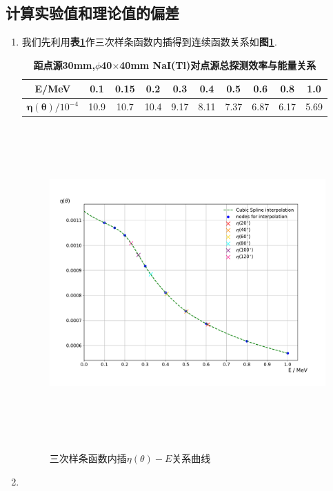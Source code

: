 \documentclass[a4paper]{article}
\begin{document}
\subsection{计算实验值和理论值的偏差}\label{sub4}
\begin{enumerate}[(1)]
\item 
我们先利用\textbf{表\ref{tab:table3}}作三次样条函数内插得到连续函数关系如\textbf{图\ref{fig:fig2}}.
\begin{table}[H]
\caption{\textbf{距点源30mm,$\phi$40$\times$40mm NaI(Tl)对点源总探测效率与能量关系}}
\label{tab:table3}
\begin{center}
\setlength{\tabcolsep}{4mm}
\begin{tabular}{|c|c|c|c|c|c|c|c|c|c|}%
    \toprule
	\hline
	\textbf{E/MeV} & 0.1 & 0.15 & 0.2 & 0.3 & 0.4 & 0.5 & 0.6 & 0.8 & 1.0\\ \hline
	$\bm{\eta(\theta)}/10^{-4}$ & 10.9 & 10.7 & 10.4 & 9.17 & 8.11 & 7.37 & 6.87 & 6.17 & 5.69\\ \hline
	\bottomrule
	\end{tabular}
\end{center}
\end{table}
\begin{figure}[H]
 \centering
 \caption{三次样条函数内插$\eta(\theta)-E$关系曲线}
 \includegraphics[height=12cm, width=16cm]{images/phyex2_fig1.pdf}
 \label{fig:fig2}
\end{figure}
\item 

\end{enumerate}
\end{document}
